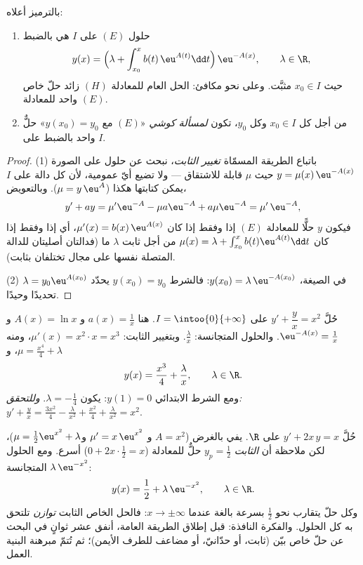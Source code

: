 \begin{theorem}\label{thm:b1:diffeq:voc}
بالترميز أعلاه:
\begin{enumerate}
  \item حلول $(E)$ على $I$ هي بالضبط
        \[
        y(x) = \Bigl(\lambda + \int_{x_0}^{x} b(t)\, \eu^{A(t)} \dd t
        \Bigr)\, \eu^{-A(x)},
        \qquad \lambda \in \R,
        \]
        حيث $x_0 \in I$ مثبَّت. وعلى نحو مكافئ: الحل العام
        للمعادلة $(H)$ زائد حلّ خاص واحد للمعادلة $(E)$.
  \item من أجل كل $x_0 \in I$ وكل $y_0$، تكون \emph{لمسألة كوشي} «$(E)$ مع $y(x_0) = y_0$»
        حلٌّ واحد بالضبط على $I$.
\end{enumerate}
\end{theorem}

\begin{proof}
(1) باتباع الطريقة المسمّاة \emph{تغيير
الثابت}، نبحث عن حلول على
الصورة $y = \mu(x)\, \eu^{-A(x)}$ حيث $\mu$ قابلة للاشتقاق --- ولا تضيع
أيّ عمومية، لأن كل دالة على $I$ يمكن كتابتها هكذا
($\mu = y\,\eu^{A}$). وبالتعويض،
\[
y' + ay = \mu' \eu^{-A} - \mu a \eu^{-A} + a\mu\eu^{-A}
= \mu'\, \eu^{-A},
\]
فيكون $y$ حلًّا للمعادلة $(E)$ إذا وفقط إذا كان $\mu'(x) = b(x)\,\eu^{A(x)}$، أي إذا
وفقط إذا كان $\mu(x) = \lambda + \int_{x_0}^x b(t)\eu^{A(t)}\dd t$ من أجل
ثابت $\lambda$ ما (فدالتان أصليتان للدالة المتصلة نفسها
على مجال تختلفان بثابت).

(2) في الصيغة، $y(x_0) = \lambda\,\eu^{-A(x_0)}$: فالشرط
$y(x_0) = y_0$ يحدّد $\lambda = y_0 \eu^{A(x_0)}$ تحديدًا وحيدًا.
\end{proof}

\begin{example}\label{ex:b1:diffeq:order1}
حُلَّ $y' + \dfrac{y}{x} = x^2$ على $I = \intoo{0}{+\infty}$. هنا
$a(x) = \frac 1x$ و $A(x) = \ln x$ و$\eu^{-A(x)} = \frac 1x$.
والحلول المتجانسة: $\frac{\lambda}{x}$. وبتغيير الثابت:
$\mu'(x) = x^2 \cdot x = x^3$، ومنه $\mu = \frac{x^4}{4} + \lambda$، و
\[
y(x) = \frac{x^3}{4} + \frac{\lambda}{x}, \qquad \lambda \in \R .
\]
ومع الشرط الابتدائي $y(1) = 0$: يكون $\lambda = -\frac14$.
\emph{وللتحقق:} $y' + \frac yx = \frac{3x^2}{4} - \frac{\lambda}{x^2} +
\frac{x^2}{4} + \frac{\lambda}{x^2} = x^2$.
\end{example}

\begin{example}\label{ex:b1:diffeq:guess}
حُلَّ $y' + 2x\,y = x$ على $\R$.  يفي بالغرض ($A =
x^2$ و $\mu' = x\,\eu^{x^2}$ و$\mu = \frac12\eu^{x^2} + \lambda$)،
لكن ملاحظة أن \emph{الثابت} $y_p = \frac12$ حلٌّ
للمعادلة ($0 + 2x\cdot\frac12 = x$) أسرع. ومع
الحلول المتجانسة $\lambda\,\eu^{-x^2}$:
\[
y(x) = \frac12 + \lambda\,\eu^{-x^2}, \qquad \lambda \in \R .
\]
وكل حلّ يتقارب نحو $\frac12$ بسرعة بالغة عندما $x \to
\pm\infty$: فالحل الخاص الثابت \emph{توازن}
تلتحق به كل الحلول. والفكرة النافذة: قبل إطلاق
الطريقة العامة، أنفق عشر ثوانٍ في البحث عن حلّ خاص
بيّن (ثابت، أو حدّانيّ، أو مضاعف للطرف الأيمن)؛ ثم تُتمّ
مبرهنة البنية العمل.
\end{example}

